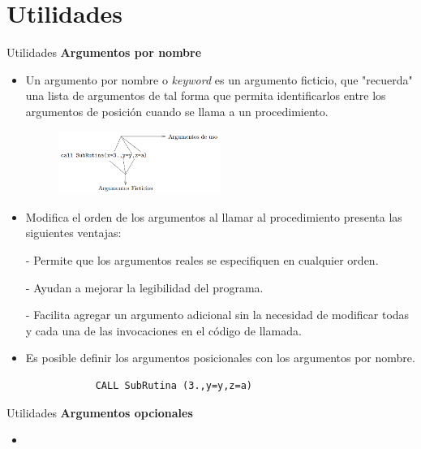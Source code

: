 
\section{Utilidades}  



\begin{frame}[fragile]{Utilidades}
\textbf{Argumentos por nombre}
 \begin{itemize}[<+(1)->]
    \item Un argumento por nombre o \emph{keyword} es un argumento ficticio, que "recuerda" una lista de argumentos de tal forma que permita identificarlos entre los argumentos de posición cuando se llama a un procedimiento.
        \begin{figure}
            \includegraphics[width=0.5\textwidth]{./resources/keywords.png}
        \end{figure}
    \item Modifica el orden de los argumentos al llamar al procedimiento presenta las siguientes ventajas:
    \item [-] Permite que los argumentos reales se especifiquen en cualquier orden.
    \item [-] Ayudan a mejorar la legibilidad del programa.
    \item [-] Facilita agregar un argumento adicional sin la necesidad de modificar todas y cada una de las invocaciones en el código de llamada.
    \item Es posible definir los argumentos posicionales con los argumentos por nombre. 
    \item []
        \begin{verbatim}
            CALL SubRutina (3.,y=y,z=a)
        \end{verbatim}
 \end{itemize}
\end{frame}

\begin{frame}[fragile]{Utilidades}
\textbf{Argumentos opcionales}
 \begin{itemize}[<+(1)->]
    \item 
 \end{itemize}
\end{frame}